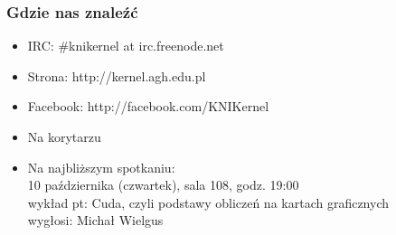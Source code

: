 \documentclass[10pt]{beamer}
\begin{document}
\begin{frame}
	\frametitle{Gdzie nas znaleźć}
	\begin{itemize}
		\item<2->IRC: \#knikernel at irc.freenode.net
		\item<3->Strona: http://kernel.agh.edu.pl
		\item<4->Facebook: http://facebook.com/KNIKernel
		\item<5->Na korytarzu
		\item<6->Na najbliższym spotkaniu:\\
		10 października (czwartek), sala 108, godz. 19:00\\
		wykład pt: Cuda, czyli podstawy obliczeń na kartach graficznych\\
		wygłosi: Michał Wielgus
	\end{itemize}
\end{frame}
\end{document}
